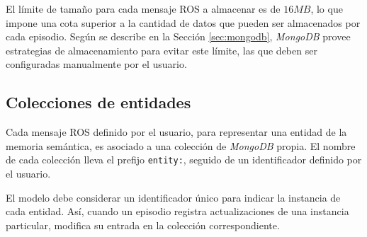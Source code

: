 El límite de tamaño para cada mensaje ROS a almacenar es de $16 MB$, lo que impone una cota superior a la cantidad de datos que pueden ser almacenados por cada episodio. Según se describe en la Sección  \ref{sec:mongodb}, \textit{MongoDB} provee estrategias de almacenamiento para evitar este límite, las que deben ser configuradas manualmente por el usuario.



\subsection{Colecciones de entidades}

Cada mensaje ROS definido por el usuario, para representar una entidad de la memoria semántica, es asociado a una colección de \textit{MongoDB} propia. El nombre de cada colección lleva el prefijo \texttt{entity:}, seguido de un identificador definido por el usuario. 

El modelo debe considerar un identificador único para indicar la instancia de cada entidad. Así, cuando un episodio registra actualizaciones de una instancia particular, modifica su entrada en la colección correspondiente.


